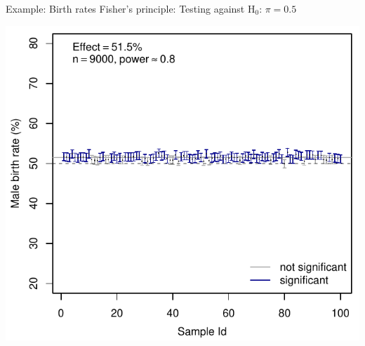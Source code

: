 \documentclass[aspectratio=169]{beamer}
\begin{document}
\begin{frame}[fragile]{Example: Birth rates}
  {Fisher's principle: Testing against H$_0$: $\pi = 0.5$}
  \begin{center}
    \includegraphics[scale=.7]{fig/ci_high}
  \end{center}
\end{frame}


% 
% 
% 
% 
% 
\end{document}
